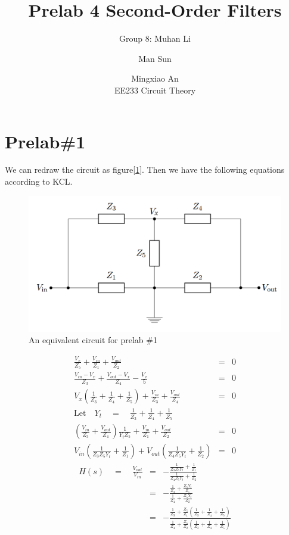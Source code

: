 \documentclass{IEEEtran}
\title{Prelab 4 Second-Order Filters}
\author{Group 8: Muhan Li \and Man Sun \and Mingxiao An \\ EE233 Circuit Theory}
\begin{document}
	\maketitle
	\section{\textbf{Prelab\#1}}
	We can redraw the circuit as figure[\ref{fig:1.1}]. Then we have the following equations according to KCL.\\
	\begin{figure}[!htbp]
		\centering
		\begin{framed}
			\includegraphics[width=\linewidth]{images/1_1.png}
			\caption{An equivalent circuit for prelab \#1}
			\label{fig:1.1}
		\end{framed}
	\end{figure}
	\begin{eqnarray*}
	\frac{V_x}{Z_5} + \frac{V_{in}}{Z_1}+\frac{V_{out}}{Z_2} & = & 0\\
	\frac{V_{in}-V_x}{Z_3} + \frac{V_{out}-V_x}{Z_4} - \frac{V_x}{5} & = & 0\\
	V_x(\frac{1}{Z_3}+\frac{1}{Z_4}+\frac{1}{Z_5})  + \frac{V_{in}}{Z_3}+\frac{V_{out}}{Z_4} & = & 0\\
	\mathrm{Let}\quad Y_t \quad=\quad \frac{1}{Z_3}+\frac{1}{Z_4}+\frac{1}{Z_5} & & \\
	(\frac{V_{in}}{Z_3}+\frac{V_{out}}{Z_4})\frac{1}{Y_tZ_5} + \frac{V_{in}}{Z_1} +\frac{V_{out}}{Z_2} & = & 0\\
	V_{in}(\frac{1}{Z_3Z_5Y_t}+\frac{1}{Z_1}) + V_{out}(\frac{1}{Z_4Z_5Y_t} + \frac{1}{Z_2}) & = & 0	
	\end{eqnarray*}
	\begin{eqnarray*}
		H(s) \quad=\quad \frac{V_{out}}{V_{in}} & = & -\frac{\frac{1}{Z_3Z_5Y_t}+\frac{1}{Z_1}}{\frac{1}{Z_4Z_5Y_t}+\frac{1}{Z_2}}\\
		& = & - \frac{\frac{1}{Z_3}+\frac{Z_5Y_t}{Z_1}}{\frac{1}{Z_4}+\frac{Z_5Y_t}{Z_2}}\\
		& = & - \frac{\frac{1}{Z_3}+\frac{Z_5}{Z_1}(\frac{1}{Z_3}+\frac{1}{Z_4}+\frac{1}{Z_5})} {\frac{1}{Z_4}+\frac{Z_5}{Z_2}(\frac{1}{Z_3}+\frac{1}{Z_4}+\frac{1}{Z_5})}
	\end{eqnarray*}
\end{document}
